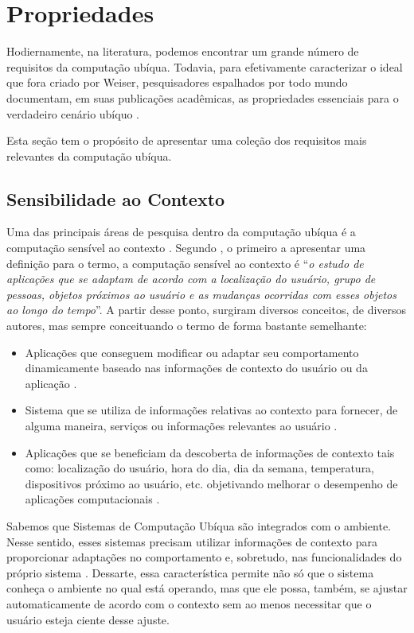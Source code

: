 \section{Propriedades}
\label{sc:propriedades}
Hodiernamente, na literatura, podemos encontrar um grande número de requisitos da computação ubíqua. Todavia, para efetivamente caracterizar o ideal que fora criado por Weiser, pesquisadores espalhados por todo mundo documentam, em suas publicações acadêmicas, as propriedades essenciais para o verdadeiro cenário ubíquo \citep{gomes2007}. 

Esta seção tem o propósito de apresentar uma coleção dos requisitos mais relevantes da computação ubíqua. 

\subsection{Sensibilidade ao Contexto}
Uma das principais áreas de pesquisa dentro da computação ubíqua é a computação sensível ao contexto  \citep{carmo2012}. Segundo \cite{schilit1994}, o primeiro a apresentar uma definição para o termo, a computação sensível ao contexto é “\textit{o estudo de aplicações que se adaptam de acordo com a localização do usuário, grupo de pessoas, objetos próximos ao usuário e as mudanças ocorridas com esses objetos ao longo do tempo}”. A partir desse ponto, surgiram diversos conceitos, de diversos autores, mas sempre conceituando o termo de forma bastante semelhante:

\begin{itemize}
\item Aplicações que conseguem modificar ou adaptar seu comportamento dinamicamente baseado nas informações de contexto do usuário ou da aplicação \citep{ryan1997}.
\item Sistema que se utiliza de informações relativas ao contexto para fornecer, de alguma maneira, serviços ou informações relevantes ao usuário \citep{dey2000}.
\item Aplicações que se beneficiam da descoberta de informações de contexto tais como: localização do usuário, hora do dia, dia da semana, temperatura, dispositivos próximo ao usuário, etc. objetivando melhorar o desempenho de aplicações computacionais \citep{chen2000}.
\end{itemize}

Sabemos que Sistemas de Computação Ubíqua são integrados com o ambiente. Nesse sentido, esses sistemas precisam utilizar informações de contexto para proporcionar adaptações no comportamento e, sobretudo, nas funcionalidades do próprio sistema \citep{tandler2004}. Dessarte, essa característica permite não só que o sistema conheça o ambiente no qual está operando, mas que ele possa, também, se ajustar automaticamente de acordo com o contexto sem ao menos necessitar que o usuário esteja ciente desse ajuste.            

